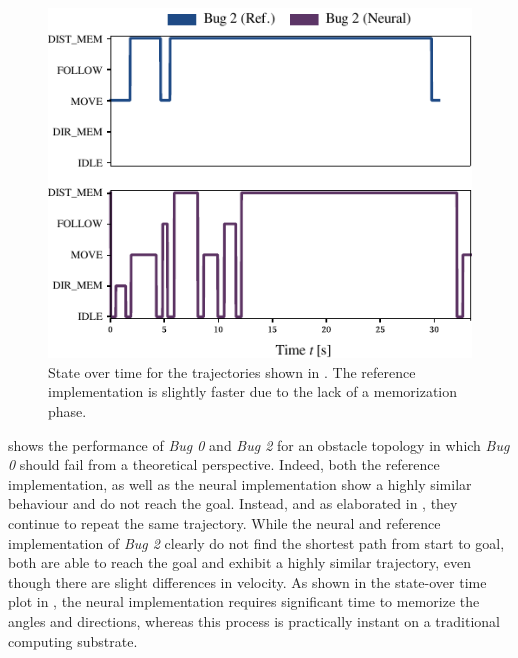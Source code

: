 \documentclass[letterpaper,10pt,conference]{ieeeconf}
\begin{document}
\begin{figure}
	\centering
	\includegraphics{media/vis_trace_map_demo_03_bug_2_ref_bug_2_neural.pdf}
	\caption{State over time for the trajectories shown in . The reference implementation is slightly faster due to the lack of a memorization phase.}
	\label{fig:experiment_1_states}
\end{figure}
 shows the performance of \emph{Bug 0} and \emph{Bug 2} for an obstacle topology in which \emph{Bug 0} should fail from a theoretical perspective. Indeed, both the reference implementation, as well as the neural implementation show a highly similar behaviour and do not reach the goal. Instead, and as elaborated in , they continue to repeat the same trajectory. While the neural and reference implementation of \emph{Bug 2} clearly do not find the shortest path from start to goal, both are able to reach the goal and exhibit a highly similar trajectory, even though there are slight differences in velocity. As shown in the state-over time plot in , the neural implementation requires significant time to memorize the angles and directions, whereas this process is practically instant on a traditional computing substrate.
\end{document}
